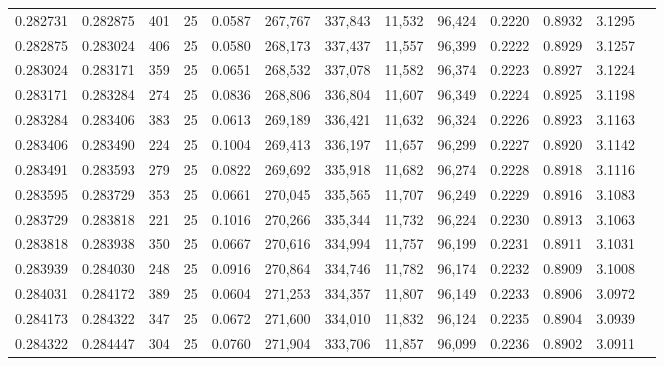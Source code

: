 \begin{tabular}{rrrrrrrrrrrrr}
0.282731 & 0.282875 &   401 &  25 &                                     0.0587 & 267,767 & 337,843 &  11,532 &  96,424 & 0.2220 & 0.8932 & 3.1295 \\
0.282875 & 0.283024 &   406 &  25 &                                     0.0580 & 268,173 & 337,437 &  11,557 &  96,399 & 0.2222 & 0.8929 & 3.1257 \\
0.283024 & 0.283171 &   359 &  25 &                                     0.0651 & 268,532 & 337,078 &  11,582 &  96,374 & 0.2223 & 0.8927 & 3.1224 \\
0.283171 & 0.283284 &   274 &  25 &                                     0.0836 & 268,806 & 336,804 &  11,607 &  96,349 & 0.2224 & 0.8925 & 3.1198 \\
0.283284 & 0.283406 &   383 &  25 &                                     0.0613 & 269,189 & 336,421 &  11,632 &  96,324 & 0.2226 & 0.8923 & 3.1163 \\
0.283406 & 0.283490 &   224 &  25 &                                     0.1004 & 269,413 & 336,197 &  11,657 &  96,299 & 0.2227 & 0.8920 & 3.1142 \\
0.283491 & 0.283593 &   279 &  25 &                                     0.0822 & 269,692 & 335,918 &  11,682 &  96,274 & 0.2228 & 0.8918 & 3.1116 \\
0.283595 & 0.283729 &   353 &  25 &                                     0.0661 & 270,045 & 335,565 &  11,707 &  96,249 & 0.2229 & 0.8916 & 3.1083 \\
0.283729 & 0.283818 &   221 &  25 &                                     0.1016 & 270,266 & 335,344 &  11,732 &  96,224 & 0.2230 & 0.8913 & 3.1063 \\
0.283818 & 0.283938 &   350 &  25 &                                     0.0667 & 270,616 & 334,994 &  11,757 &  96,199 & 0.2231 & 0.8911 & 3.1031 \\
0.283939 & 0.284030 &   248 &  25 &                                     0.0916 & 270,864 & 334,746 &  11,782 &  96,174 & 0.2232 & 0.8909 & 3.1008 \\
0.284031 & 0.284172 &   389 &  25 &                                     0.0604 & 271,253 & 334,357 &  11,807 &  96,149 & 0.2233 & 0.8906 & 3.0972 \\
0.284173 & 0.284322 &   347 &  25 &                                     0.0672 & 271,600 & 334,010 &  11,832 &  96,124 & 0.2235 & 0.8904 & 3.0939 \\
0.284322 & 0.284447 &   304 &  25 &                                     0.0760 & 271,904 & 333,706 &  11,857 &  96,099 & 0.2236 & 0.8902 & 3.0911 \\

\end{tabular}

